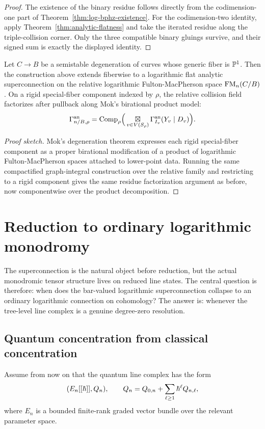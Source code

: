 \begin{proof}
The existence of the binary residue follows directly from the codimension-one part of Theorem~\ref{thm:log-bphz-existence}. For the codimension-two identity, apply Theorem~\ref{thm:analytic-flatness} and take the iterated residue along the triple-collision corner. Only the three compatible binary gluings survive, and their signed sum is exactly the displayed identity.
\end{proof}

\begin{theorem}%
Let $C\to B$ be a semistable degeneration of curves whose generic fiber is $\mathbb P^1$. Then the construction above extends fiberwise to a logarithmic flat analytic superconnection on the relative logarithmic Fulton-MacPherson space $\mathrm{FM}_n(C/B)$. On a rigid special-fiber component indexed by $\rho$, the relative collision field factorizes after pullback along Mok's birational product model:
\[
 \Gamma_{n/B,\rho}^{\mathrm{an}}
 =
 \mathrm{Comp}_\rho\Big(
 \mathop{\boxtimes}\displaylimits_{v\in V(S_\rho)} \Gamma_{I_v}^{\mathrm{an}}(Y_v\mid D_v)
 \Big).
\]
\end{theorem}

\begin{proof}[Proof sketch]
Mok's degeneration theorem expresses each rigid special-fiber component as a proper birational modification of a product of logarithmic Fulton-MacPherson spaces attached to lower-point data. Running the same compactified graph-integral construction over the relative family and restricting to a rigid component gives the same residue factorization argument as before, now componentwise over the product decomposition.
\end{proof}

\section{Reduction to ordinary logarithmic monodromy}%

The superconnection is the natural object before reduction, but the actual monodromic tensor structure lives on reduced line states. The central question is therefore: when does the bar-valued logarithmic superconnection collapse to an ordinary logarithmic connection on cohomology? The answer is: whenever the tree-level line complex is a genuine degree-zero resolution.

\subsection{Quantum concentration from classical concentration}
Assume from now on that the quantum line complex has the form
\[
 (E_n[[\hbar]],Q_n),
 \qquad
 Q_n=Q_{0,n}+\sum_{\ell\ge 1}\hbar^\ell Q_{n,\ell},
\]
where $E_n$ is a bounded finite-rank graded vector bundle over the relevant parameter space.

